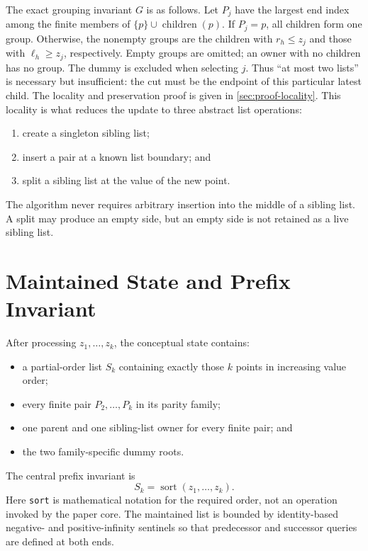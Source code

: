 The exact grouping invariant $G$ is as follows. Let $P_j$ have the largest
end index among the finite members of $\{p\}\cup\operatorname{children}(p)$.
If $P_j=p$, all children form one group. Otherwise, the nonempty groups are
the children with $r_h\leq z_j$ and those with $\ell_h\geq z_j$, respectively.
Empty groups are omitted; an owner with no children has no group.
The dummy is excluded when selecting $j$. Thus ``at most two lists'' is
necessary but insufficient: the cut must be the endpoint of this particular
latest child. The locality and preservation proof is given in
\cref{sec:proof-locality}.
This locality is what reduces the update to three abstract list operations:
\begin{enumerate}
  \item create a singleton sibling list;
  \item insert a pair at a known list boundary; and
  \item split a sibling list at the value of the new point.
\end{enumerate}
The algorithm never requires arbitrary insertion into the middle of a sibling
list. A split may produce an empty side, but an empty side is not retained as
a live sibling list.

\section{Maintained State and Prefix Invariant}
\label{sec:algorithm-state}

After processing $z_1,\ldots,z_k$, the conceptual state contains:
\begin{itemize}
  \item a partial-order list $S_k$ containing exactly those $k$ points in
    increasing value order;
  \item every finite pair $P_2,\ldots,P_k$ in its parity family;
  \item one parent and one sibling-list owner for every finite pair; and
  \item the two family-specific dummy roots.
\end{itemize}
The central prefix invariant is
\begin{equation}
  S_k=\operatorname{sort}(z_1,\ldots,z_k).
  \label{eq:algorithm-prefix-invariant}
\end{equation}
Here \texttt{sort} is mathematical notation for the required order, not an
operation invoked by the paper core. The maintained list is bounded by
identity-based negative- and positive-infinity sentinels so that predecessor
and successor queries are defined at both ends.

